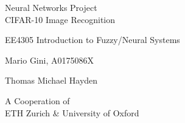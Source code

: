     \begin{titlepage}

    \begin{center}
    \vspace*{6cm}
    \centering
    \Huge
    { 
    	Neural Networks Project\\
    	CIFAR-10 Image Recognition }
    \vspace{2cm}

    \Huge
    {EE4305 Introduction to Fuzzy/Neural Systems}
    \vspace{0.5cm}
    
    \Large
    {Mario Gini, A0175086X 
    	
    Thomas Michael Hayden\\
	}
	\vspace{1cm}
	\Large
	{
		A Cooperation of\\
		ETH Zurich \& University of Oxford}
   
    \end{center}
    \end{titlepage}